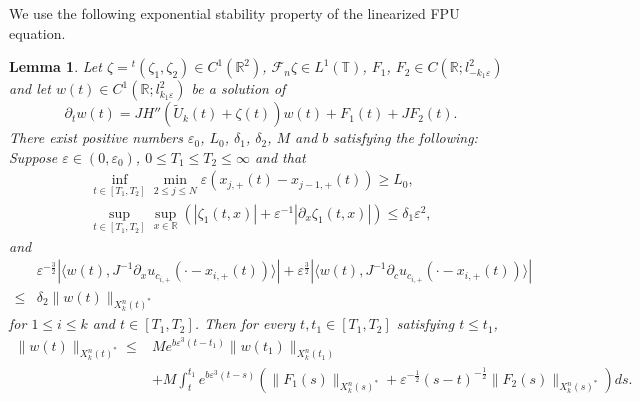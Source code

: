 \documentclass[11pt]{amsart}
\newtheorem{lemma}[theorem]{Lemma}
\theoremstyle{remark}
\numberwithin{equation}{section}
\begin{document}
We use the following exponential stability property of the linearized FPU
equation.
\begin{lemma}
  \label{lem:linearstability}
Let $\zeta={}^t(\zeta_1,\zeta_2)\in C^1({\mathbb{R}}^2)$,
 $\mathcal{F}_n\zeta\in L^1({\mathbb{T}})$,
$F_1$, $F_2\in C({\mathbb{R}};l^2_{-k_1{\varepsilon}})$ and let
$w(t)\in C^1({\mathbb{R}};l^2_{k_1{\varepsilon}})$ be a solution of 
\begin{equation}
  \label{eq:LFPU2}
{\partial}_tw(t)=JH''(\widetilde{U}_k(t)+\zeta(t))w(t)+F_1(t)+JF_2(t).
\end{equation}
There exist positive numbers ${\varepsilon}_0$, $L_0$, $\delta_1$, $\delta_2$, $M$ and
$b$ satisfying the following: Suppose ${\varepsilon}\in(0,{\varepsilon}_0)$,
$0\le T_1\le T_2\le \infty$ and that
\begin{gather*}
\inf_{t\in[T_1,T_2]}\min_{2\le j\le N}{\varepsilon}(x_{j,+}(t)-x_{j-1,+}(t))\ge L_0,\\
\sup_{t\in[T_1,T_2]}\sup_{x\in{\mathbb{R}}}
(|\zeta_1(t,x)|+{\varepsilon}^{-1}|{\partial}_x\zeta_1(t,x)|)\le \delta_1{\varepsilon}^2,
\end{gather*}
and
\begin{equation}
  \label{eq:orth3'}
  \begin{split}
 & {\varepsilon}^{-\frac32}|{\langle} w(t), J^{-1}{\partial}_xu_{c_{i,+}}(\cdot-x_{i,+}(t)){\rangle}|
+{\varepsilon}^{\frac32}|{\langle} w(t),J^{-1}{\partial}_cu_{c_{i,+}}(\cdot-x_{i,+}(t)){\rangle}|
\\ \le &  \delta_2\|w(t)\|_{X_k^n(t)^*}
\end{split}
\end{equation}
for $1\le i\le k$ and  $t\in[T_1,T_2]$.
Then for every $t, t_1\in[T_1,T_2]$ satisfying $t\le t_1$,
\begin{align*}
 \|w(t)\|_{X_k^n(t)^*}  \le &
Me^{b{\varepsilon}^3(t-t_1)}\|w(t_1)\|_{X_k^n(t_1)}
\\ &+M\int^{t_1}_t e^{b{\varepsilon}^3(t-s)}
(\|F_1(s)\|_{X_k^n(s)^*}+{\varepsilon}^{-\frac12} (s-t)^{-\frac12}\|F_2(s)\|_{X_k^n(s)^*})ds.
\end{align*}
\end{lemma}
\end{document}

